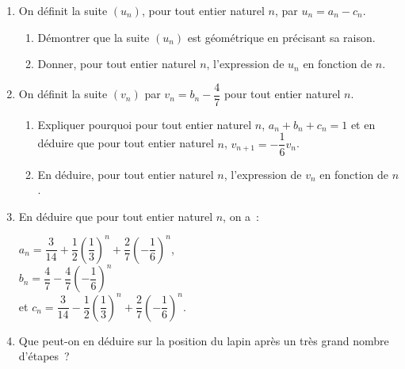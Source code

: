 \begin{enumerate}
     \item On définit la suite $\left(u_n\right)$, pour tout entier naturel $n$, par $u_n = a_n - c_n$.
     \begin{enumerate}[label=\alph*.]
          \item Démontrer que la suite $\left(u_n\right)$ est géométrique en précisant sa raison.
          \item Donner, pour tout entier naturel $n$, l'expression de $u_n$ en fonction de $n$.
     \end{enumerate}
     \item  On définit la suite $\left(v_n\right)$ par $v_n = b_n - \dfrac{4}{7}$ pour tout entier naturel $n$.
     \begin{enumerate}[label=\alph*.]
          \item Expliquer pourquoi pour tout entier naturel $n$,\: $a_n + b_n + c_n = 1$ et en déduire que pour tout
          entier naturel $n$,\: $v_{n+1} = - \dfrac{1}{6}v_n$.
          \item En déduire, pour tout entier naturel $n$, l'expression de $v_n$ en fonction de $n$.
     \end{enumerate}
     \item  En déduire que pour tout entier naturel $n$, on a~:
     
\begin{center}
     $a_{n} = \dfrac{3}{14} +\dfrac{1}{2}\left(\dfrac{1}{3}\right)^n + \dfrac{2}{7}\left(- \dfrac{1}{6}\right)^n$, \\ $b_{n} = \dfrac{4}{7} - \dfrac{4}{7}\left(- \dfrac{1}{6}\right)^n $ \\et $c_{n} = \dfrac{3}{14} -\dfrac{1}{2}\left(\dfrac{1}{3}\right)^n + \dfrac{2}{7}\left(- \dfrac{1}{6}\right)^n.$
\end{center}
     \item  Que peut-on en déduire sur la position du lapin après un très grand nombre d'étapes~?
\end{enumerate}

